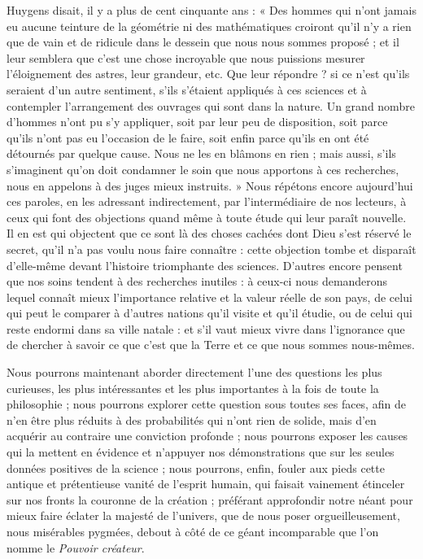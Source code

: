 \documentclass[a4paper, 11pt, oneside, landscape]{article}
\begin{document}
Huygens disait, il y a plus de cent cinquante ans : « Des hommes qui n'ont jamais eu aucune teinture de la géométrie ni des mathématiques croiront qu'il n'y a rien que de vain et de ridicule dans le dessein que nous nous sommes proposé ; et il leur semblera que c'est une chose incroyable que nous puissions mesurer l'éloignement des astres, leur grandeur, etc. Que leur répondre ? si ce n'est qu'ils seraient d'un autre sentiment, s'ils s'étaient appliqués à ces sciences et à contempler l'arrangement des ouvrages qui sont dans la nature. Un grand nombre d'hommes n'ont pu s'y appliquer, soit par leur peu de disposition, soit parce qu'ils n'ont pas eu l'occasion de le faire, soit enfin parce qu'ils en ont été détournés par quelque cause. Nous ne les en blâmons en rien ; mais aussi, s'ils s'imaginent qu'on doit condamner le soin que nous apportons à ces recherches, nous en appelons à des juges mieux instruits. » Nous répétons encore aujourd'hui ces paroles, en les adressant indirectement, par l'intermédiaire de nos lecteurs, à ceux qui font des objections quand même à toute étude qui leur paraît nouvelle. Il en est qui objectent que ce sont là des choses cachées dont Dieu s'est réservé le secret, qu'il n'a pas voulu nous faire connaître : cette objection tombe et disparaît d'elle-même devant l'histoire triomphante des sciences. D'autres encore pensent que nos soins tendent à des recherches inutiles : à ceux-ci nous demanderons lequel connaît mieux l'importance relative et la valeur réelle de son pays, de celui qui peut le comparer à d'autres nations qu'il visite et qu'il étudie, ou de celui qui reste endormi dans sa ville natale : et s'il vaut mieux vivre dans l'ignorance que de chercher à savoir ce que c'est que la Terre et ce que nous sommes nous-mêmes.

Nous pourrons maintenant aborder directement l'une des questions les plus curieuses, les plus intéressantes et les plus importantes à la fois de toute la philosophie ; nous pourrons explorer cette question sous toutes ses faces, afin de n'en être plus réduits à des probabilités qui n'ont rien de solide, mais d'en acquérir au contraire une conviction profonde ; nous pourrons exposer les causes qui la mettent en évidence et n'appuyer nos démonstrations que sur les seules données positives de la science ; nous pourrons, enfin, fouler aux pieds cette antique et prétentieuse vanité de l'esprit humain, qui faisait vainement étinceler sur nos fronts la couronne de la création ; préférant approfondir notre néant pour mieux faire éclater la majesté de l'univers, que de nous poser orgueilleusement, nous misérables pygmées, debout à côté de ce géant incomparable que l'on nomme le \emph{Pouvoir créateur}.
\end{document}
